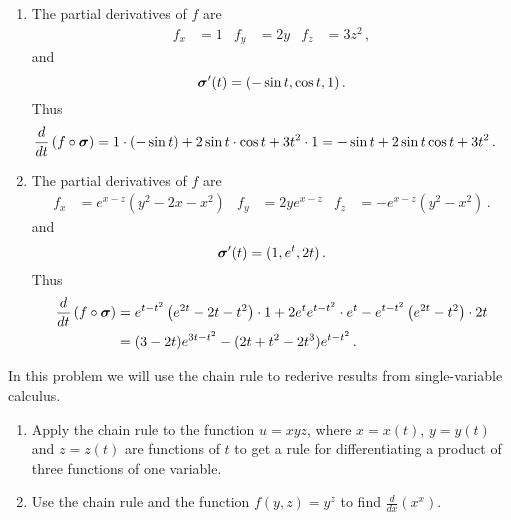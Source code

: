 \begin{solution}
\begin{enumerate}
\item
The partial derivatives of $f$ are
\begin{align*}
f_x &= 1 &
f_y &= 2y &
f_z &= 3z^2\,,
\end{align*}
and
\[
\bm {\sigma}'(t) = (-\sin t, \cos t, 1)\,.
\]
Thus
\begin{align*}
\frac{d}{dt}\left(f \circ \bm {\sigma}\right) &=
 1 \cdot \left( - \sin t\right) + 2\sin t \cdot \cos t + 3t^2 \cdot 1
= -\sin t + 2 \sin t \cos t + 3t^2\,.
\end{align*}

\item
The partial derivatives of $f$ are
\begin{align*}
f_x &= e^{x-z}(y^2-2x-x^2) &
f_y &= 2ye^{x-z} &
f_z &= -e^{x-z}(y^2-x^2)\,.
\end{align*}
and
\[
\bm{\sigma}'(t) = (1, e^t, 2t)\,.
\]
Thus
\begin{align*}
\frac{d}{dt}\left(f \circ \bm {\sigma}\right) &=
 e^{t-t^2}\left(e^{2t}-2t-t^2\right) \cdot 1 + 2e^{t} e^{t-t^2} \cdot e^t
- e^{t-t^2} \left(e^{2t}-t^2\right) \cdot 2t \\
&= (3-2t)e^{3t-t^2} - (2t+t^2-2t^3)e^{t-t^2}\,.
\end{align*}
\end{enumerate}
\end{solution}

\begin{question}
In this problem we will use the chain rule to rederive results from single-variable calculus.
\begin{enumerate}
\item
Apply the chain rule to the function $u=xyz$, where $x=x(t)$, $y=y(t)$ and $z=z(t)$ are functions of $t$ to get a rule for differentiating a product of three functions of one variable.
\item
Use the chain rule and the function $f(y,z) = y^z$ to find $\displaystyle\frac{d}{dx}\left( x^x \right)$.
\end{enumerate}
\end{question}


